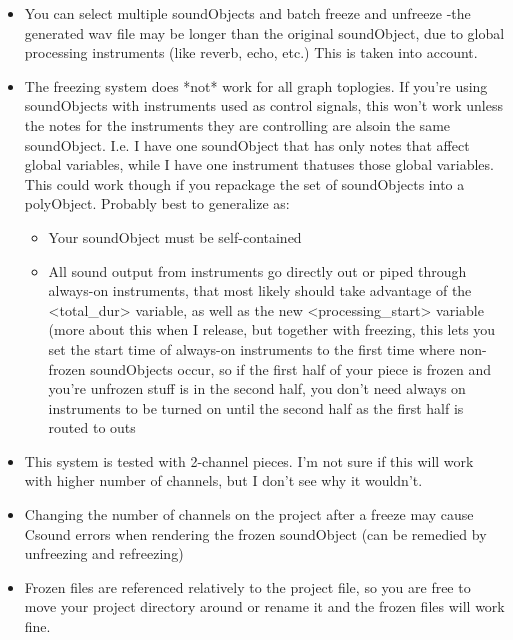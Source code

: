\begin{itemize}
\item
  You can select multiple soundObjects and batch freeze and unfreeze
  -the generated wav file may be longer than the original soundObject,
  due to global processing instruments (like reverb, echo, etc.) This is
  taken into account.
\item
  The freezing system does *not* work for all graph toplogies. If you're
  using soundObjects with instruments used as control signals, this
  won't work unless the notes for the instruments they are controlling
  are alsoin the same soundObject. I.e. I have one soundObject that has
  only notes that affect global variables, while I have one instrument
  thatuses those global variables. This could work though if you
  repackage the set of soundObjects into a polyObject. Probably best to
  generalize as:

  \begin{itemize}
  \item
    Your soundObject must be self-contained
  \item
    All sound output from instruments go directly out or piped through
    always-on instruments, that most likely should take advantage of the
    \textless{}total\_dur\textgreater{} variable, as well as the new
    \textless{}processing\_start\textgreater{} variable (more about this
    when I release, but together with freezing, this lets you set the
    start time of always-on instruments to the first time where
    non-frozen soundObjects occur, so if the first half of your piece is
    frozen and you're unfrozen stuff is in the second half, you don't
    need always on instruments to be turned on until the second half as
    the first half is routed to outs
  \end{itemize}
\item
  This system is tested with 2-channel pieces. I'm not sure if this will
  work with higher number of channels, but I don't see why it wouldn't.
\item
  Changing the number of channels on the project after a freeze may
  cause Csound errors when rendering the frozen soundObject (can be
  remedied by unfreezing and refreezing)
\item
  Frozen files are referenced relatively to the project file, so you are
  free to move your project directory around or rename it and the frozen
  files will work fine.
\end{itemize}
